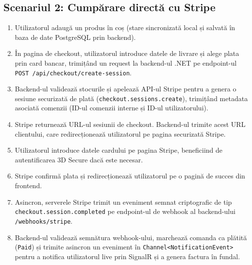 \subsection{Scenariul 2: Cumpărare directă cu Stripe}
\begin{enumerate}
    \item Utilizatorul adaugă un produs în coș (stare sincronizată local și salvată în baza de date PostgreSQL prin backend).
    \item În pagina de checkout, utilizatorul introduce datele de livrare și alege plata prin card bancar, trimițând un request la backend-ul .NET pe endpoint-ul \texttt{POST /api/checkout/create-session}.
    \item Backend-ul validează stocurile și apelează API-ul Stripe pentru a genera o sesiune securizată de plată (\texttt{checkout.sessions.create}), trimițând metadata asociată comenzii (ID-ul comenzii interne și ID-ul utilizatorului).
    \item Stripe returnează URL-ul sesiunii de checkout. Backend-ul trimite acest URL clientului, care redirecționează utilizatorul pe pagina securizată Stripe.
    \item Utilizatorul introduce datele cardului pe pagina Stripe, beneficiind de autentificarea 3D Secure dacă este necesar.
    \item Stripe confirmă plata și redirecționează utilizatorul pe o pagină de succes din frontend.
    \item Asincron, serverele Stripe trimit un eveniment semnat criptografic de tip \texttt{checkout.session.completed} pe endpoint-ul de webhook al backend-ului \texttt{/webhooks/stripe}.
    \item Backend-ul validează semnătura webhook-ului, marchează comanda ca plătită (\texttt{Paid}) și trimite asincron un eveniment în \texttt{Channel<NotificationEvent>} pentru a notifica utilizatorul live prin SignalR și a genera factura în fundal.
\end{enumerate}

